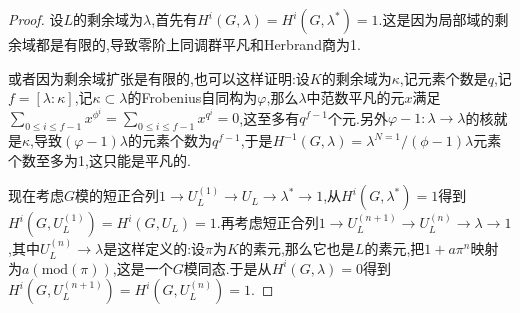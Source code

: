 \begin{enumerate}
\begin{proof}
    	设$L$的剩余域为$\lambda$,首先有$H^i(G,\lambda)=H^i(G,\lambda^*)=1$.这是因为局部域的剩余域都是有限的,导致零阶上同调群平凡和Herbrand商为1.
    	
    	或者因为剩余域扩张是有限的,也可以这样证明:设$K$的剩余域为$\kappa$,记元素个数是$q$,记$f=[\lambda:\kappa]$,记$\kappa\subset\lambda$的Frobenius自同构为$\varphi$,那么$\lambda$中范数平凡的元$x$满足$\sum_{0\le i\le f-1}x^{\phi^i}=\sum_{0\le i\le f-1}x^{q^i}=0$,这至多有$q^{f-1}$个元.另外$\varphi-1:\lambda\to\lambda$的核就是$\kappa$,导致$(\varphi-1)\lambda$的元素个数为$q^{f-1}$,于是$H^{-1}(G,\lambda)=\lambda^{N=1}/(\phi-1)\lambda$元素个数至多为1,这只能是平凡的.
    	
    	现在考虑$G$模的短正合列$1\to U_L^{(1)}\to U_L\to\lambda^*\to1$,从$H^i(G,\lambda^*)=1$得到$H^i(G,U_L^{(1)})=H^i(G,U_L)=1$.再考虑短正合列$1\to U_L^{(n+1)}\to U_L^{(n)}\to\lambda\to1$,其中$U_L^{(n)}\to\lambda$是这样定义的:设$\pi$为$K$的素元,那么它也是$L$的素元,把$1+a\pi^n$映射为$a(\mathrm{mod}(\pi))$,这是一个$G$模同态.于是从$H^i(G,\lambda)=0$得到$H^i(G,U_L^{(n+1)})=H^i(G,U_L^{(n)})=1$.
    \end{proof}
\end{enumerate}

